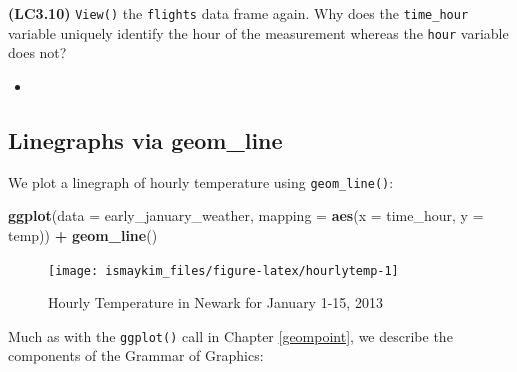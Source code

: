 \documentclass[12pt,]{krantz}
\makeatletter
\newenvironment{Shaded}{\begin{snugshade}}{\end{snugshade}}
\newcommand{\KeywordTok}[1]{\textcolor[rgb]{0.27,0.27,0.27}{\textbf{#1}}}
\newcommand{\DataTypeTok}[1]{\textcolor[rgb]{0.27,0.27,0.27}{#1}}
\newcommand{\StringTok}[1]{\textcolor[rgb]{0.5,0.5,0.5}{#1}}
\newcommand{\OperatorTok}[1]{\textcolor[rgb]{0.43,0.43,0.43}{\textbf{#1}}}
\newcommand{\NormalTok}[1]{#1}
\newenvironment{kframe}{%
\medskip{}
\setlength{\fboxsep}{.8em}
 \def\at@end@of@kframe{}%
 \ifinner\ifhmode%
  \def\at@end@of@kframe{\end{minipage}}%
  \begin{minipage}{\columnwidth}%
 \fi\fi%
 \def\FrameCommand##1{\hskip\@totalleftmargin \hskip-\fboxsep
 \colorbox{shadecolor}{##1}\hskip-\fboxsep
     \hskip-\linewidth \hskip-\@totalleftmargin \hskip\columnwidth}%
 \MakeFramed {\advance\hsize-\width
   \@totalleftmargin\z@ \linewidth\hsize
   \@setminipage}}%
 {\par\unskip\endMakeFramed%
 \at@end@of@kframe}
\renewenvironment{Shaded}{\begin{kframe}}{\end{kframe}}
\newenvironment{rmdblock}[1]
  {\begin{shaded*}
  \begin{itemize}
  \renewcommand{\labelitemi}{
    \raisebox{-.7\height}[0pt][0pt]{
    }
  }
  \item
  }
  {
  \end{itemize}
  \end{shaded*}
  }
\newenvironment{learncheck}
  {\begin{rmdblock}{warning}}
  {\end{rmdblock}}
\makeatother
\begin{document}
\textbf{(LC3.10)} \texttt{View()} the \texttt{flights} data frame again.
Why does the \texttt{time\_hour} variable uniquely identify the hour of
the measurement whereas the \texttt{hour} variable does not?

\begin{learncheck}

\end{learncheck}

\subsection{Linegraphs via geom\_line}\label{geomline}

We plot a linegraph of hourly temperature using \texttt{geom\_line()}:

\begin{Shaded}
\begin{Highlighting}[]
\KeywordTok{ggplot}\NormalTok{(}\DataTypeTok{data =}\NormalTok{ early_january_weather, }
       \DataTypeTok{mapping =} \KeywordTok{aes}\NormalTok{(}\DataTypeTok{x =}\NormalTok{ time_hour, }\DataTypeTok{y =}\NormalTok{ temp)) }\OperatorTok{+}
\StringTok{  }\KeywordTok{geom_line}\NormalTok{()}
\end{Highlighting}
\end{Shaded}

\begin{figure}

{\centering \texttt{[image: ismaykim\_files/figure-latex/hourlytemp-1]} 

}

\caption{Hourly Temperature in Newark for January 1-15, 2013}\label{fig:hourlytemp}
\end{figure}

Much as with the \texttt{ggplot()} call in Chapter \ref{geompoint}, we
describe the components of the Grammar of Graphics:
\end{document}
